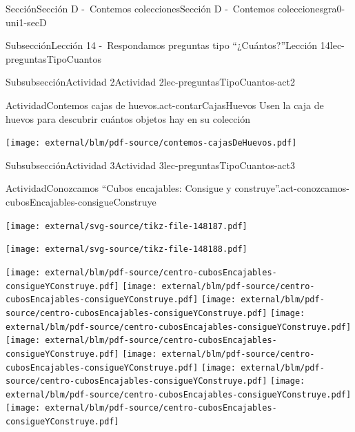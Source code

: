 \begin{sectionptx}{Sección}{Sección D -~Contemos colecciones}{}{Sección D -~Contemos colecciones}{}{}{gra0-uni1-secD}
\begin{subsectionptx}{Subsección}{Lección 14 -~Respondamos preguntas tipo “¿Cuántos?”}{}{Lección 14}{}{}{lec-preguntasTipoCuantos}
%
%
\typeout{************************************************}
\typeout{************************************************}
%
\begin{subsubsectionptx}{Subsubsección}{Actividad 2}{}{Actividad 2}{}{}{lec-preguntasTipoCuantos-act2}
\begin{activity}{Actividad}{Contemos cajas de huevos.}{act-contarCajasHuevos}%
Usen la caja de huevos para descubrir cuántos objetos hay en su colección%
\begin{cutoutpage}
\texttt{[image: external/blm/pdf-source/contemos-cajasDeHuevos.pdf]}
\end{cutoutpage}
\end{activity}%
\end{subsubsectionptx}
%
%
\typeout{************************************************}
\typeout{************************************************}
%
\begin{subsubsectionptx}{Subsubsección}{Actividad 3}{}{Actividad 3}{}{}{lec-preguntasTipoCuantos-act3}
\begin{activity}{Actividad}{Conozcamos “Cubos encajables: Consigue y construye”.}{act-conozcamos-cubosEncajables-consigueConstruye}%
\begin{image}{0}{1}{0}{}%
\texttt{[image: external/svg-source/tikz-file-148187.pdf]}
\end{image}%
\begin{image}{0}{1}{0}{}%
\texttt{[image: external/svg-source/tikz-file-148188.pdf]}
\end{image}%
\begin{cutoutpage}
\texttt{[image: external/blm/pdf-source/centro-cubosEncajables-consigueYConstruye.pdf]}
\clearpage
\texttt{[image: external/blm/pdf-source/centro-cubosEncajables-consigueYConstruye.pdf]}
\clearpage
\texttt{[image: external/blm/pdf-source/centro-cubosEncajables-consigueYConstruye.pdf]}
\clearpage
\texttt{[image: external/blm/pdf-source/centro-cubosEncajables-consigueYConstruye.pdf]}
\clearpage
\texttt{[image: external/blm/pdf-source/centro-cubosEncajables-consigueYConstruye.pdf]}
\clearpage
\texttt{[image: external/blm/pdf-source/centro-cubosEncajables-consigueYConstruye.pdf]}
\clearpage
\texttt{[image: external/blm/pdf-source/centro-cubosEncajables-consigueYConstruye.pdf]}
\clearpage
\texttt{[image: external/blm/pdf-source/centro-cubosEncajables-consigueYConstruye.pdf]}
\clearpage
\texttt{[image: external/blm/pdf-source/centro-cubosEncajables-consigueYConstruye.pdf]}

\end{cutoutpage}
\end{activity}
\end{subsubsectionptx}
\end{subsectionptx}
\end{sectionptx}
